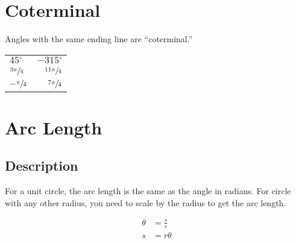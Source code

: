 \documentclass{exam}
\newcommand{\dg}{\ensuremath{^\circ}}
\begin{document}
  \section{Coterminal}
  Angles with the same ending line are ``coterminal.''

  \begin{tabular}[H]{lr}
    \toprule
    $45 \dg$             & $-315 \dg$ \\
    $\sfrac{3 \pi}{4}$   & $\sfrac{11 \pi}{4}$ \\
    $- \sfrac{\pi}{4}$   & $\sfrac{7 \pi}{4}$ \\
    \bottomrule
  \end{tabular}

  \section{Arc Length}

  \subsection{Description}
  For a unit circle, the arc length is the same as the angle in radians.  For circle with any other radius, you need to
  scale by the radius to get the arc length.

  \begin{align*}
    \theta & = \frac{s}{r} \\
    s      & = r \theta \\
  \end{align*}

\end{document}
